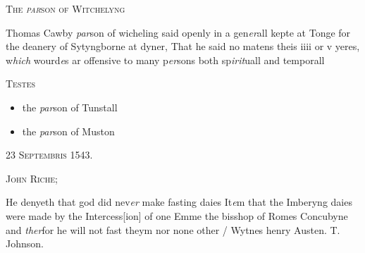 \documentclass[12pt, a4paper]{book}
\begin{document}
               
               	
				\begin{center}  {\scshape The \textit{par}son of Witchelyng}  \end{center}
			
               	
		\ifthenelse{\isodd{\thepage}}
		{\reversemarginpar}
		{\normalmarginpar}
		Thomas Cawby \textit{par}son of wicheling said openly
 in a gen\textit{er}all kepte at Tonge for the deanery of
 Sytyngborne at dyner, That he said no matens
 theis iiii or v yeres, w\textit{hich} wourd\textit{e}s ar offensive to
 many p\textit{er}sons both sp\textit{irit}uall and temporall
\begin{center} {\scshape Testes} \end{center}\begin{itemize}
	
 \item[]the \textit{par}son of Tunstall
	\item[]the \textit{par}son of Muston
\end{itemize}
 

            
            
               
				\begin{center} \begin{large} {\scshape 
                  23 Septembris 1543.} \end{large} \end{center}
			
               
                  
				\begin{center}  {\scshape John Riche;}  \end{center}
			

	
				\marginpar[\vspace{0.5cm}{\textcolor{Gray}{ fastynge dayes}}]{}
			
	
		\ifthenelse{\isodd{\thepage}}
		{\reversemarginpar}
		{\normalmarginpar}
		He denyeth that god did nev\textit{er} make fasting daies
 It\textit{e}m that the Imberyng daies were made by the Intercess[ion]
 of one Emme the bisshop of Romes Concubyne and \textit{ther}for
 he will not fast theym nor none other / Wytnes henry
 Austen. T. Johnson.


               

\dotfill
					  \subsection*{}  \subsection*{}  \subsection*{}
\end{document}

